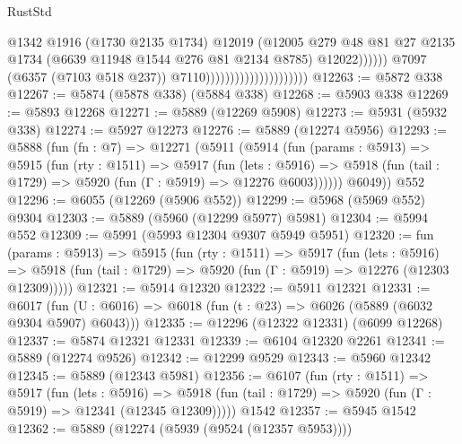 \begin{lexlean}{RustStd}
\begin{coremodule}
                                                        @1342
                                                        @1916
                                                        (@1730 @2135 @1734)
                                                        @12019
                                                        (@12005
                                                          @279
                                                          @48
                                                          @81
                                                          @27
                                                          @2135
                                                          @1734
                                                          (@6639 @11948 @1544 @276 @81 @2134 @8785)
                                                          @12022))))))
                                              @7097
                                              (@6357 (@7103 @518 @237))
                                              @7110)))))))))))))))))))))
@12263 := @5872 @338
@12267 := @5874 (@5878 @338) (@5884 @338)
@12268 := @5903 @338
@12269 := @5893 @12268
@12271 := @5889 (@12269 @5908)
@12273 := @5931 (@5932 @338)
@12274 := @5927 @12273
@12276 := @5889 (@12274 @5956)
@12293 := @5888
    (fun (fn : @7) =>
    @12271
      (@5911
        (@5914
          (fun (params : @5913) =>
          @5915
            (fun (rty : @1511) =>
            @5917
              (fun (lets : @5916) =>
              @5918 (fun (tail : @1729) => @5920 (fun (Γ : @5919) => @12276 @6003))))))
        @6049))
    @552
@12296 := @6055 (@12269 (@5906 @552))
@12299 := @5968 (@5969 @552) @9304
@12303 := @5889 (@5960 (@12299 @5977) @5981)
@12304 := @5994 @552
@12309 := @5991 (@5993 @12304 @9307 @5949 @5951)
@12320 := fun (params : @5913) =>
  @5915
    (fun (rty : @1511) =>
    @5917
      (fun (lets : @5916) =>
      @5918 (fun (tail : @1729) => @5920 (fun (Γ : @5919) => @12276 (@12303 @12309)))))
@12321 := @5914 @12320
@12322 := @5911 @12321
@12331 := @6017
    (fun (U : @6016) => @6018 (fun (t : @23) => @6026 (@5889 (@6032 @9304 @5907) @6043)))
@12335 := @12296 (@12322 @12331) (@6099 @12268)
@12337 := @5874 @12321 @12331
@12339 := @6104 @12320 @2261
@12341 := @5889 (@12274 @9526)
@12342 := @12299 @9529
@12343 := @5960 @12342
@12345 := @5889 (@12343 @5981)
@12356 := @6107
    (fun (rty : @1511) =>
    @5917
      (fun (lets : @5916) =>
      @5918 (fun (tail : @1729) => @5920 (fun (Γ : @5919) => @12341 (@12345 @12309)))))
    @1542
@12357 := @5945 @1542
@12362 := @5889 (@12274 (@5939 (@9524 (@12357 @5953))))

\end{coremodule}
\end{lexlean}
